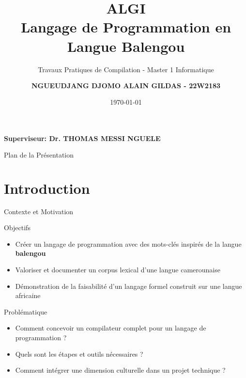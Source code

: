 \documentclass[10pt]{beamer}
\title[ALGI]{ALGI\\Langage de Programmation en Langue Balengou}
\subtitle{Travaux Pratiques de Compilation - Master 1 Informatique}
\author[DJOMO ALAIN]{\textbf{NGUEUDJANG DJOMO ALAIN GILDAS - 22W2183}}
\institute[UY1]{\textbf{Université de Yaoundé I\\Faculté des Sciences\\Département d'Informatique}}
\date{\today}
\begin{document}
\begin{frame}
    \titlepage
    \begin{center}
        \textbf{Superviseur: Dr. THOMAS MESSI NGUELE}
    \end{center}
\end{frame}

\begin{frame}{Plan de la Présentation}
    \centering
    \tableofcontents
\end{frame}

\section{Introduction}

\begin{frame}{Contexte et Motivation}
    \begin{block}{Objectifs}
        \begin{itemize}
            \item Créer un langage de programmation avec des mots-clés inspirés de la langue \textbf{balengou}
            \item Valoriser et documenter un corpus lexical d'une langue camerounaise
            \item Démonstration de la faisabilité d'un langage formel construit sur une langue africaine
        \end{itemize}
    \end{block}
    
    \begin{block}{Problématique}
        \begin{itemize}
            \item Comment concevoir un compilateur complet pour un langage de programmation ?
            \item Quels sont les étapes et outils nécessaires ?
            \item Comment intégrer une dimension culturelle dans un projet technique ?
        \end{itemize}
    \end{block}
\end{frame}
\end{document}
